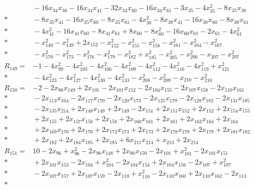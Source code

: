 \documentclass[11pt]{article}
\theoremstyle{remark}\newtheorem{remark}[theorem]{Remark}
\begin{document}
\begin{align*}
&{} - 16x_{34}x_{38} - 16x_{34}x_{41} - 32x_{34}x_{60} - 16x_{34}x_{61} - 3x_{35} - 4x_{35}^{2} - 8x_{35}x_{38} \\*
&{} - 8x_{35}x_{41} - 16x_{35}x_{60} - 8x_{35}x_{61} - 4x_{38}^{2} - 8x_{38}x_{41} - 16x_{38}x_{60} - 8x_{38}x_{61} \\*
&{} - 4x_{41}^{2} - 16x_{41}x_{60} - 8x_{41}x_{61} + 8x_{60} - 8x_{60}^{2} - 16x_{60}x_{61} - 2x_{61} - 4x_{61}^{2} \\*
&{} - x_{140}^{2} - x_{149}^{2} + 2x_{152} - x_{152}^{2} - x_{155}^{2} - x_{158}^{2} - x_{161}^{2} - x_{164}^{2} - x_{167}^{2} \\*
&{} - x_{170}^{2} - x_{173}^{2} - x_{176}^{2} - x_{179}^{2} - x_{182}^{2} + x_{185}^{2} - x_{205}^{2} - x_{206}^{2} - x_{207} - x_{207}^{2} \\[4pt]
R_{149} ={}& -1 - 4x_{99}^{2} - 4x_{103}^{2} - 4x_{106}^{2} - 4x_{109}^{2} - 4x_{112}^{2} - 4x_{116}^{2} - 4x_{119}^{2} + x_{121}^{2} \\*
&{} - 4x_{123}^{2} - 4x_{127}^{2} - 4x_{130}^{2} - 4x_{133}^{2} - x_{208}^{2} - x_{209}^{2} - x_{210} - x_{210}^{2} \\[4pt]
R_{150} ={}& -2 - 2x_{96}x_{149} + 2x_{101} - 2x_{101}x_{152} - 2x_{104}x_{155} - 2x_{107}x_{158} - 2x_{110}x_{161} \\*
&{} - 2x_{113}x_{164} - 2x_{117}x_{170} - 2x_{120}x_{173} - 2x_{125}x_{179} - 2x_{128}x_{182} - 2x_{131}x_{185} \\*
&{} - 2x_{135}x_{214} + 2x_{148}x_{149} + 2x_{149} - 2x_{151} + 2x_{151}x_{152} + 2x_{152} + 2x_{154}x_{155} \\*
&{} + 2x_{155} + 2x_{157}x_{158} + 2x_{158} + 2x_{160}x_{161} + 2x_{161} + 2x_{163}x_{164} + 2x_{164} \\*
&{} + 2x_{169}x_{170} + 2x_{170} + 2x_{172}x_{173} + 2x_{173} + 2x_{178}x_{179} + 2x_{179} + 2x_{181}x_{182} \\*
&{} + 2x_{182} + 2x_{184}x_{185} + 2x_{185} + 6x_{211}x_{214} + x_{213} + 2x_{214} \\[4pt]
R_{151} ={}& 10 - 2x_{96} + x_{96}^{2} - 2x_{96}x_{148} + 2x_{96}x_{150} - 2x_{101} + x_{101}^{2} - 2x_{101}x_{151} \\*
&{} + 2x_{101}x_{153} - 2x_{104} + x_{104}^{2} - 2x_{104}x_{154} + 2x_{104}x_{156} - 2x_{107} + x_{107}^{2} \\*
&{} - 2x_{107}x_{157} + 2x_{107}x_{159} - 2x_{110} + x_{110}^{2} - 2x_{110}x_{160} + 2x_{110}x_{162} - 2x_{113} \\*

\end{align*}
\end{document}
